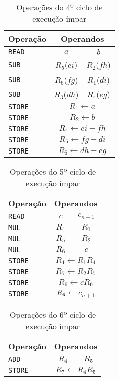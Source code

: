 \begin{multicols}{2}
\begin{table}[H]
\centering
\begin{tabular}{l|c|c}
Operação & \multicolumn{2}{c}{Operandos} \\
\hline
\texttt{READ} & $a$ & $b$ \\
\hline
\texttt{SUB} & $R_5$($ei$) & $R_2$($fh$) \\
\texttt{SUB} & $R_6$($fg$) & $R_1$($di$) \\
\texttt{SUB} & $R_3$($dh$) & $R_4$($eg$) \\
\hline
\texttt{STORE} & \multicolumn{2}{c}{$R_1\leftarrow a$} \\
\texttt{STORE} & \multicolumn{2}{c}{$R_2\leftarrow b$} \\
\texttt{STORE} & \multicolumn{2}{c}{$R_4\leftarrow ei - fh$} \\
\texttt{STORE} & \multicolumn{2}{c}{$R_5\leftarrow fg - di$} \\
\texttt{STORE} & \multicolumn{2}{c}{$R_6\leftarrow dh - eg$} \\
\end{tabular}
\caption{Operações do 4º ciclo de execução ímpar}
\label{tab:odd_4}
\end{table}

\begin{table}[H]
\centering
\begin{tabular}{l|c|c}
Operação & \multicolumn{2}{c}{Operandos} \\
\hline
\texttt{READ} & $c$ & $c_{n+1}$ \\
\hline
\texttt{MUL} & $R_4$ & $R_1$ \\
\texttt{MUL} & $R_5$ & $R_2$ \\
\texttt{MUL} & $R_6$ & $c$ \\
\hline
\texttt{STORE} & \multicolumn{2}{c}{$R_4\leftarrow R_1R_4$} \\
\texttt{STORE} & \multicolumn{2}{c}{$R_5\leftarrow R_2R_5$} \\
\texttt{STORE} & \multicolumn{2}{c}{$R_6\leftarrow c R_6$} \\
\texttt{STORE} & \multicolumn{2}{c}{$R_8\leftarrow c_{n+1}$} \\
\end{tabular}
\caption{Operações do 5º ciclo de execução ímpar}
\label{tab:odd_5}
\end{table}

\begin{table}[H]
\centering
\begin{tabular}{l|c|c}
Operação & \multicolumn{2}{c}{Operandos} \\
\hline
\texttt{ADD} & $R_4$ & $R_5$ \\
\hline
\texttt{STORE} &\multicolumn{2}{c}{$R_7\leftarrow R_4R_5$} \\
\end{tabular}
\caption{Operações do 6º ciclo de execução ímpar}
\label{tab:odd_6}
\end{table}


\end{multicols}
